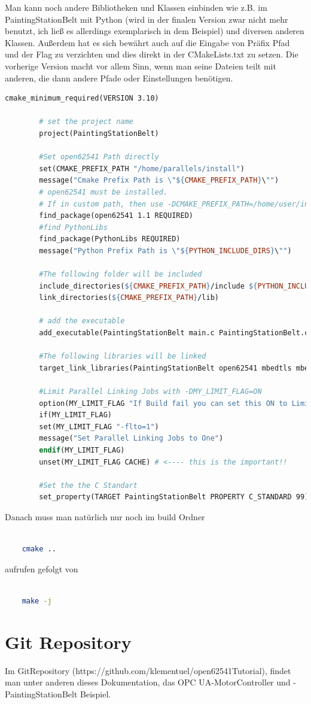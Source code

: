 	Man kann noch andere Bibliotheken und Klassen einbinden wie z.B. im PaintingStationBelt mit Python (wird in der finalen Version zwar nicht mehr benutzt, ich ließ es allerdings exemplarisch in dem Beispiel) und diversen anderen Klassen. Außerdem hat es sich bewährt auch auf die Eingabe von Präfix Pfad und der Flag zu verzichten und dies direkt in der CMakeLists.txt zu setzen. Die vorherige Version macht vor allem Sinn, wenn man seine Dateien teilt mit anderen, die dann andere Pfade oder Einstellungen benötigen.
	\begin{lstlisting}[language=make]
		cmake_minimum_required(VERSION 3.10)
		
		# set the project name
		project(PaintingStationBelt)
		
		#Set open62541 Path directly
		set(CMAKE_PREFIX_PATH "/home/parallels/install")
		message("Cmake Prefix Path is \"${CMAKE_PREFIX_PATH}\"")
		# open62541 must be installed.
		# If in custom path, then use -DCMAKE_PREFIX_PATH=/home/user/install
		find_package(open62541 1.1 REQUIRED)
		#find PythonLibs
		find_package(PythonLibs REQUIRED)
		message("Python Prefix Path is \"${PYTHON_INCLUDE_DIRS}\"")
		
		#The following folder will be included
		include_directories(${CMAKE_PREFIX_PATH}/include ${PYTHON_INCLUDE_DIRS} PyhtonScripts)
		link_directories(${CMAKE_PREFIX_PATH}/lib)
		
		# add the executable
		add_executable(PaintingStationBelt main.c PaintingStationBelt.c Callbacks.c OpcUaHelper.c KpiCalculator.c)
		
		#The following libraries will be linked
		target_link_libraries(PaintingStationBelt open62541 mbedtls mbedx509 mbedcrypto pthread ${PYTHON_LIBRARIES})
		
		#Limit Parallel Linking Jobs with -DMY_LIMIT_FLAG=ON
		option(MY_LIMIT_FLAG "If Build fail you can set this ON to Limit parralel Linking Jobs to One" OFF) #OFF by default
		if(MY_LIMIT_FLAG)
		set(MY_LIMIT_FLAG "-flto=1")
		message("Set Parallel Linking Jobs to One")
		endif(MY_LIMIT_FLAG)
		unset(MY_LIMIT_FLAG CACHE) # <---- this is the important!!
		
		#Set the the C Standart
		set_property(TARGET PaintingStationBelt PROPERTY C_STANDARD 99)
	\end{lstlisting}
	Danach muss man natürlich nur noch im build Ordner 
		\begin{lstlisting}[language=Bash]

	cmake .. 
		\end{lstlisting}

	aufrufen gefolgt von 
		\begin{lstlisting}[language=Bash]

	make -j
		\end{lstlisting}

\clearpage
	\section{Git Repository}
	Im GitRepository (https://github.com/klementuel/open62541Tutorial), findet man unter anderen dieses Dokumentation, das OPC UA-MotorController und -PaintingStationBelt Beispiel.

